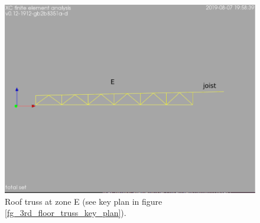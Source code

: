 \begin{figure}
  \begin{center}
  \includegraphics[width=120mm]{figures/roof_truss_E}
  \end{center}
  \caption{Roof truss at zone E (see key plan in figure \ref{fg_3rd_floor_truss_key_plan}).}\label{fg_roof_truss_E}
\end{figure}
